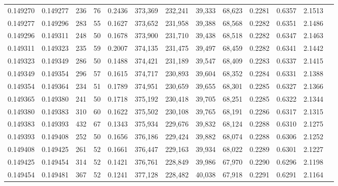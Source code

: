 \begin{tabular}{rrrrrrrrrrrrr}
0.149270 & 0.149277 &   236 &  76 &                                     0.2436 & 373,369 & 232,241 &  39,333 &  68,623 & 0.2281 & 0.6357 & 2.1513 \\
0.149277 & 0.149296 &   283 &  55 &                                     0.1627 & 373,652 & 231,958 &  39,388 &  68,568 & 0.2282 & 0.6351 & 2.1486 \\
0.149296 & 0.149311 &   248 &  50 &                                     0.1678 & 373,900 & 231,710 &  39,438 &  68,518 & 0.2282 & 0.6347 & 2.1463 \\
0.149311 & 0.149323 &   235 &  59 &                                     0.2007 & 374,135 & 231,475 &  39,497 &  68,459 & 0.2282 & 0.6341 & 2.1442 \\
0.149323 & 0.149349 &   286 &  50 &                                     0.1488 & 374,421 & 231,189 &  39,547 &  68,409 & 0.2283 & 0.6337 & 2.1415 \\
0.149349 & 0.149354 &   296 &  57 &                                     0.1615 & 374,717 & 230,893 &  39,604 &  68,352 & 0.2284 & 0.6331 & 2.1388 \\
0.149354 & 0.149364 &   234 &  51 &                                     0.1789 & 374,951 & 230,659 &  39,655 &  68,301 & 0.2285 & 0.6327 & 2.1366 \\
0.149365 & 0.149380 &   241 &  50 &                                     0.1718 & 375,192 & 230,418 &  39,705 &  68,251 & 0.2285 & 0.6322 & 2.1344 \\
0.149380 & 0.149383 &   310 &  60 &                                     0.1622 & 375,502 & 230,108 &  39,765 &  68,191 & 0.2286 & 0.6317 & 2.1315 \\
0.149383 & 0.149393 &   432 &  67 &                                     0.1343 & 375,934 & 229,676 &  39,832 &  68,124 & 0.2288 & 0.6310 & 2.1275 \\
0.149393 & 0.149408 &   252 &  50 &                                     0.1656 & 376,186 & 229,424 &  39,882 &  68,074 & 0.2288 & 0.6306 & 2.1252 \\
0.149408 & 0.149425 &   261 &  52 &                                     0.1661 & 376,447 & 229,163 &  39,934 &  68,022 & 0.2289 & 0.6301 & 2.1227 \\
0.149425 & 0.149454 &   314 &  52 &                                     0.1421 & 376,761 & 228,849 &  39,986 &  67,970 & 0.2290 & 0.6296 & 2.1198 \\
0.149454 & 0.149481 &   367 &  52 &                                     0.1241 & 377,128 & 228,482 &  40,038 &  67,918 & 0.2291 & 0.6291 & 2.1164 \\

\end{tabular}

